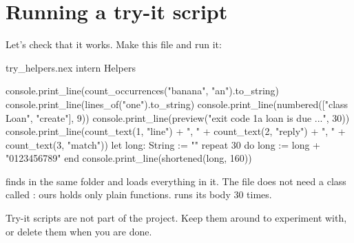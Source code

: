 \section{Running a try-it script}

Let's check that it works. Make this file and run it:

\begin{tryit}{try_helpers.nex}
intern Helpers

console.print_line(count_occurrences("banana", "an").to_string)
console.print_line(lines_of("one\n\nthree\n").to_string)
console.print_line(numbered(["class Loan", "create"], 9))
console.print_line(preview("exit code 1\nPASS a loan is due ...", 30))
console.print_line(count_text(1, "line") + ", " + count_text(2, "reply") + ", "
  + count_text(3, "match"))
let long: String := ""
repeat 30 do
  long := long + "0123456789"
end
console.print_line(shortened(long, 160))
\end{tryit}

 finds  in the same folder and loads
everything in it. The file does not need a class called :
ours holds only plain functions.  runs its body 30
times.

Try-it scripts are not part of the project. Keep them around to experiment
with, or delete them when you are done.
